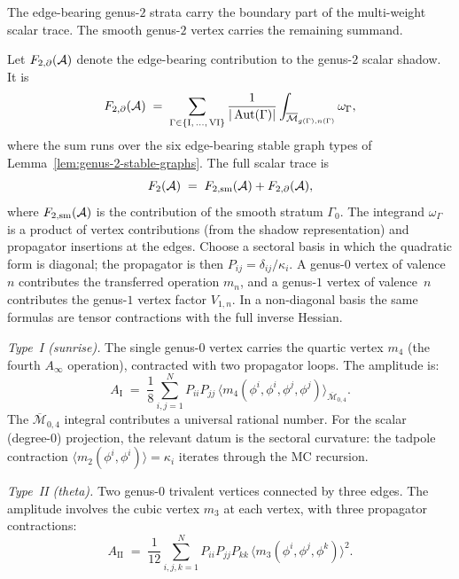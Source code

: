 The edge-bearing genus-$2$ strata carry the boundary part of the
multi-weight scalar trace. The smooth genus-$2$ vertex carries the
remaining summand.

\begin{construction}
\label{constr:genus-2-amplitudes}
Let $F_{2,\partial}(\mathcal{A})$ denote the edge-bearing contribution to the
genus-$2$ scalar shadow. It is
\begin{equation}\label{eq:F2-graph-sum}
F_{2,\partial}(\mathcal{A}) \;=\; \sum_{\Gamma \in \{\mathrm{I,\,\ldots,\,VI}\}}
\frac{1}{|\operatorname{Aut}(\Gamma)|} \int_{\overline{\mathcal{M}}_{g(\Gamma),n(\Gamma)}}
\omega_\Gamma,
\end{equation}
where the sum runs over the six edge-bearing stable graph types of
Lemma~\ref{lem:genus-2-stable-graphs}. The full scalar trace is
\begin{equation}\label{eq:F2-smooth-boundary-split}
F_2(\mathcal{A}) \;=\; F_{2,\mathrm{sm}}(\mathcal{A}) + F_{2,\partial}(\mathcal{A}),
\end{equation}
where $F_{2,\mathrm{sm}}(\mathcal{A})$ is the contribution of the smooth
stratum $\Gamma_0$.
The integrand $\omega_\Gamma$ is a product of vertex
contributions (from the shadow representation) and propagator
insertions at the edges. Choose a sectoral basis in which the
quadratic form is diagonal; the propagator is then
$P_{ij}=\delta_{ij}/\kappa_i$. A genus-$0$ vertex of valence~$n$
contributes the transferred operation $m_n$, and a genus-$1$
vertex of valence~$n$ contributes the genus-$1$ vertex factor
$V_{1,n}$. In a non-diagonal basis the same formulas are tensor
contractions with the full inverse Hessian.

\medskip\noindent
\emph{Type~I (sunrise).} The single genus-$0$ vertex carries the
quartic vertex $m_4$ (the fourth $A_\infty$ operation),
contracted with two propagator loops. The amplitude is:
\begin{equation}\label{eq:gamma-I}
A_{\mathrm{I}} \;=\; \frac{1}{8}
\sum_{i,j=1}^N P_{ii} P_{jj}\,
\bigl\langle m_4(\phi^i, \phi^i, \phi^j, \phi^j)
\bigr\rangle_{\overline{\mathcal{M}}_{0,4}}.
\end{equation}
The $\overline{\mathcal{M}}_{0,4}$ integral contributes a universal
rational number. For the scalar (degree-$0$) projection,
the relevant datum is the sectoral curvature: the tadpole
contraction $\langle m_2(\phi^i, \phi^i) \rangle = \kappa_i$
iterates through the MC recursion.

\medskip\noindent
\emph{Type~II (theta).} Two genus-$0$ trivalent vertices connected by
three edges. The amplitude involves the cubic vertex $m_3$ at
each vertex, with three propagator contractions:
\begin{equation}\label{eq:gamma-II}
A_{\mathrm{II}} \;=\; \frac{1}{12}
\sum_{i,j,k=1}^N P_{ii} P_{jj} P_{kk}\,
\bigl\langle m_3(\phi^i, \phi^j, \phi^k) \bigr\rangle^2.
\end{equation}


\end{construction}
